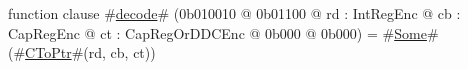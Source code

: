 function clause #\hyperref[sailMIPSzdecode]{decode}# (0b010010 @ 0b01100 @ rd : IntRegEnc @ cb : CapRegEnc @ ct : CapRegOrDDCEnc @ 0b000 @ 0b000) = #\hyperref[sailMIPSzSome]{Some}#(#\hyperref[sailMIPSzCToPtr]{CToPtr}#(rd, cb, ct))
